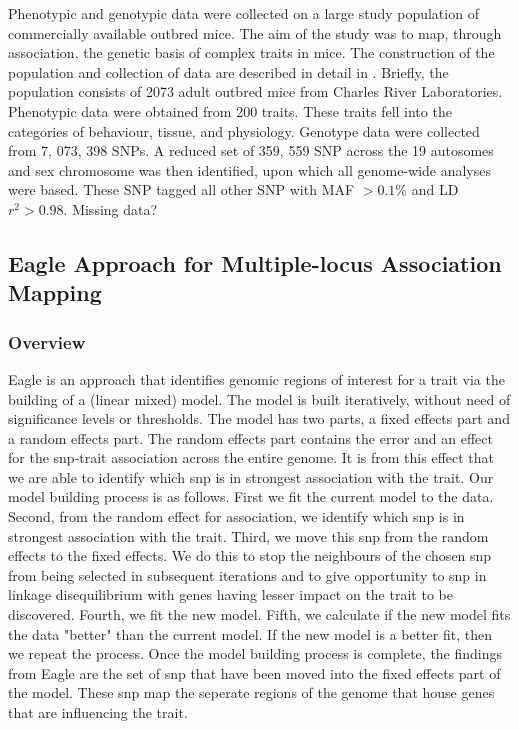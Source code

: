 \documentclass[12pt]{article}
\begin{document}
Phenotypic and genotypic data were collected on a large study population of commercially 
available outbred mice. The aim of the study was to map, through association, the genetic basis
of complex traits in mice. The construction of the population and collection of data are described in detail in 
\cite{Nicod:2016aa}.  Briefly, the population consists of 2073 adult outbred mice from Charles River Laboratories. Phenotypic data
were obtained from 200 traits. These traits fell into the categories of behaviour, tissue, and physiology. Genotype 
data were collected from 7, 073, 398 SNPs.  A reduced set of 359, 559 SNP across the 19 
autosomes and sex chromosome was then identified, upon which all genome-wide analyses were based.  These SNP tagged all other SNP with MAF $> 0.1\%$
and LD $r^2 > 0.98$.  Missing data?

\subsection{Eagle Approach for Multiple-locus Association Mapping}
\subsubsection{Overview}


Eagle is an approach that identifies genomic regions of interest for a trait via the building of a (linear mixed) model. The model is built iteratively, without need of significance levels or thresholds. The model has two parts, a fixed effects part and a random effects part. The random effects part contains the error and an effect for the snp-trait association across the entire genome. It is from this effect 
 that we are able to identify which snp is in strongest association with the trait.  
 Our model building process is as follows. First we fit the current model to the data. Second, from the random effect for association, we identify which snp is in strongest association  with the trait.  Third, we move this snp from the random effects to the fixed effects.
We do this to stop the neighbours of the chosen snp from being selected in subsequent iterations and 
to give opportunity to snp in linkage disequilibrium with genes having lesser impact on the trait to be discovered. 
 Fourth, we fit the  new model. Fifth, we calculate if the new model fits the data "better" than the current model.  If the new model is a better fit,  then we repeat the process.   Once the model building process is complete, the findings from Eagle are the set of snp that have been moved into the fixed effects part of the model.  These snp map the seperate regions of the genome that house genes that are influencing the trait.  
 
\end{document}
